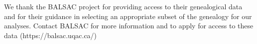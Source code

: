 
We thank the BALSAC project for providing access to their genealogical data and for their guidance in selecting an appropriate subset of the genealogy for our analyses.
Contact BALSAC for more information and to apply for access to these data (https://balsac.uqac.ca/)